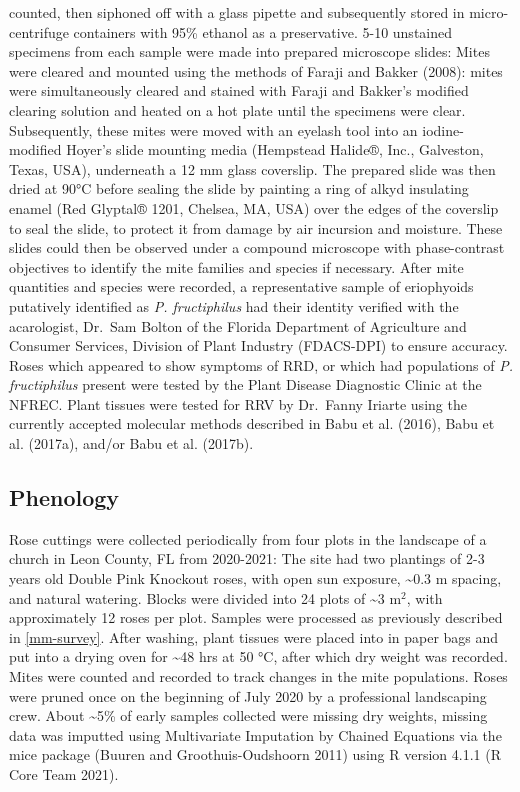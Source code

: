 \documentclass[12pt,final,CPage]{ufthesis}
\begin{document}
{counted, then siphoned off with a glass pipette and subsequently stored in micro-centrifuge containers with 95\% ethanol as a preservative. 5-10 unstained specimens from each sample were made into prepared microscope slides: Mites were cleared and mounted using the methods of Faraji and Bakker (2008): mites were simultaneously cleared and stained with Faraji and Bakker's modified clearing solution and heated on a hot plate until the specimens were clear. Subsequently, these mites were moved with an eyelash tool into an iodine-modified Hoyer's slide mounting media (Hempstead Halide®, Inc., Galveston, Texas, USA), underneath a 12 \si{\milli\metre} glass coverslip. The prepared slide was then dried at 90°C before sealing the slide by painting a ring of alkyd insulating enamel (Red Glyptal® 1201, Chelsea, MA, USA) over the edges of the coverslip to seal the slide, to protect it from damage by air incursion and moisture. These slides could then be observed under a compound microscope with phase-contrast objectives to identify the mite families and species if necessary. After mite quantities and species were recorded, a representative sample of eriophyoids putatively identified as \emph{P. fructiphilus} had their identity verified with the acarologist, Dr.~Sam Bolton of the Florida Department of Agriculture and Consumer Services, Division of Plant Industry (FDACS-DPI) to ensure accuracy. Roses which appeared to show symptoms of RRD, or which had populations of \emph{P. fructiphilus} present were tested by the Plant Disease Diagnostic Clinic at the NFREC. Plant tissues were tested for RRV by Dr.~Fanny Iriarte using the currently accepted molecular methods described in Babu et al. (2016), Babu et al. (2017a), and/or Babu et al. (2017b).

  \hypertarget{mm-pheno}{%
  \subsection{Phenology}\label{mm-pheno}}

  Rose cuttings were collected periodically from four plots in the landscape of a church in Leon County, FL from 2020-2021: The site had two plantings of 2-3 years old Double Pink Knockout roses, with open sun exposure, \textasciitilde0.3 \si{\metre} spacing, and natural watering. Blocks were divided into 24 plots of \textasciitilde3 \si{\metre}\(^2\), with approximately 12 roses per plot. Samples were processed as previously described in \ref{mm-survey}. After washing, plant tissues were placed into in paper bags and put into a drying oven for \textasciitilde48 hrs at 50 °C, after which dry weight was recorded. Mites were counted and recorded to track changes in the mite populations. Roses were pruned once on the beginning of July 2020 by a professional landscaping crew. About \textasciitilde5\% of early samples collected were missing dry weights, missing data was imputted using Multivariate Imputation by Chained Equations via the mice package (Buuren and Groothuis-Oudshoorn 2011) using R version 4.1.1 (R Core Team 2021).

}
\end{document}
